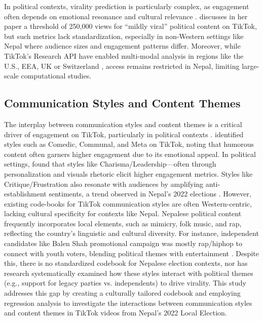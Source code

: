 \documentclass[12pt,a4paper]{report}
\begin{document}
In political contexts, virality prediction is particularly complex, as engagement often depends on emotional resonance and cultural relevance \parencite{berger2012viral}. \parencite{ingelstam2023populism} discusses in her paper a threshold of 250,000 views for “mildly viral” political content on TikTok, but such metrics lack standardization, especially in non-Western settings like Nepal where audience sizes and engagement patterns differ. Moreover, while TikTok’s Research API have enabled multi-modal analysis in regions like the U.S., EEA, UK or Switzerland \parencite{tiktokResearchAPI2025}, access remains restricted in Nepal, limiting large-scale computational studies. 

\subsection{Communication Styles and Content Themes}

The interplay between communication styles and content themes is a critical driver of engagement on TikTok, particularly in political contexts \parencite{umansky2023dances}. \parencite{schellewald2021communicative} identified styles such as Comedic, Communal, and Meta on TikTok, noting that humorous content often garners higher engagement due to its emotional appeal. In political settings, \parencite{cseri2024masterarbeit} found that styles like Charisma/Leadership—often through personalization and visuals rhetoric elicit higher engagement metrics. Styles like Critique/Frustration also resonate with audiences by amplifying anti-establishment sentiments, a trend observed in Nepal’s 2022 elections \parencite{dahal2023influence}.
\newpage
However, existing code-books for TikTok communication styles \parencite{umansky2023dances} are often Western-centric, lacking cultural specificity for contexts like Nepal. Nepalese political content frequently incorporates local elements, such as mimicry, folk music, and rap, reflecting the country’s linguistic and cultural diversity. For instance, independent candidates like Balen Shah promotional campaign was mostly rap/hiphop to connect with youth voters, blending political themes with entertainment \parencite{menge2022kathmandu}. Despite this, there is no standardized codebook for Nepalese election contexts, nor has research systematically examined how these styles interact with political themes (e.g., support for legacy parties vs. independents) to drive virality. This study addresses this gap by creating a culturally tailored codebook and employing regression analysis to investigate the interactions between communication styles and content themes in TikTok videos from Nepal’s 2022 Local Election.
\end{document}
